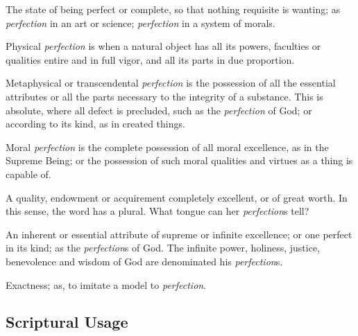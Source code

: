		\begin{compactitem}
			\item The state of being perfect or complete, so that nothing requisite is wanting; as \textit{perfection} in an art or science; \textit{perfection} in a system of morals.
			\item[1] Physical \textit{perfection} is when a natural object has all its powers, faculties or qualities entire and in full vigor, and all its parts in due proportion.
			\item[2] Metaphysical or transcendental \textit{perfection} is the possession of all the essential attributes or all the parts necessary to the integrity of a substance. This is absolute, where all defect is precluded, such as the \textit{perfection} of God; or according to its kind, as in created things.
			\item[3] Moral \textit{perfection} is the complete possession of all moral excellence, as in the Supreme Being; or the possession of such moral qualities and virtues as a thing is capable of.
			\item[4] A quality, endowment or acquirement completely excellent, or of great worth. In this sense, the word has a plural. What tongue can her \textit{perfection}s tell?
			\item[5] An inherent or essential attribute of supreme or infinite excellence; or one perfect in its kind; as the \textit{perfection}s of God. The infinite power, holiness, justice, benevolence and wisdom of God are denominated his \textit{perfection}s.
			\item[6] Exactness; as, to imitate a model to \textit{perfection}.
		\end{compactitem}




\subsection{Scriptural Usage} %
	\label{PERFECTION-SCRIPTURES}

